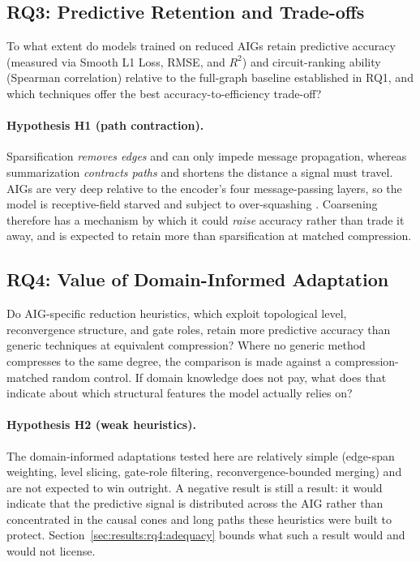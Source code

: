 \subsection{RQ3: Predictive Retention and Trade-offs}
\label{sec:intro:rq3}
To what extent do models trained on reduced AIGs retain predictive accuracy (measured via
Smooth L1 Loss, RMSE, and $R^2$) and circuit-ranking ability (Spearman correlation)
relative to the full-graph baseline established in RQ1, and which techniques offer the
best accuracy-to-efficiency trade-off?

\paragraph{Hypothesis H1 (path contraction).}
Sparsification \emph{removes edges} and can only impede message propagation, whereas
summarization \emph{contracts paths} and shortens the distance a signal must travel. AIGs
are very deep relative to the encoder's four message-passing layers, so the model is
receptive-field starved and subject to over-squashing \citep{alon2021oversquashing}.
Coarsening therefore has a mechanism by which it could \emph{raise} accuracy rather than
trade it away, and is expected to retain more than sparsification at matched compression.

\subsection{RQ4: Value of Domain-Informed Adaptation}
\label{sec:intro:rq4}
Do AIG-specific reduction heuristics, which exploit topological level, reconvergence
structure, and gate roles, retain more predictive accuracy than generic techniques at
equivalent compression? Where no generic method compresses to the same degree, the
comparison is made against a compression-matched random control. If domain knowledge does
not pay, what does that indicate about which structural features the model actually relies
on?

\paragraph{Hypothesis H2 (weak heuristics).}
The domain-informed adaptations tested here are relatively simple (edge-span weighting,
level slicing, gate-role filtering, reconvergence-bounded merging) and are not expected to
win outright. A negative result is still a result: it would indicate that the predictive
signal is distributed across the AIG rather than concentrated in the causal cones and long
paths these heuristics were built to protect. Section~\ref{sec:results:rq4:adequacy} bounds what
such a result would and would not license.

